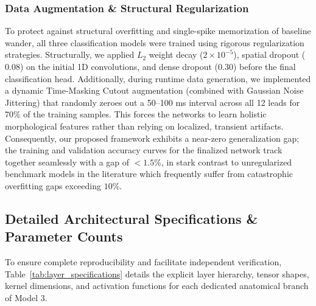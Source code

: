 \documentclass[5p,twocolumn,10pt]{elsarticle}
\begin{document}
\subsubsection{Data Augmentation \& Structural Regularization}
To protect against structural overfitting and single-spike memorization of baseline wander, all three classification models were trained using rigorous regularization strategies. Structurally, we applied $L_2$ weight decay ($2 \times 10^{-5}$), spatial dropout ($0.08$) on the initial 1D convolutions, and dense dropout ($0.30$) before the final classification head. Additionally, during runtime data generation, we implemented a dynamic Time-Masking Cutout augmentation (combined with Gaussian Noise Jittering) that randomly zeroes out a 50--100 ms interval across all 12 leads for 70\% of the training samples. This forces the networks to learn holistic morphological features rather than relying on localized, transient artifacts. Consequently, our proposed framework exhibits a near-zero generalization gap; the training and validation accuracy curves for the finalized network track together seamlessly with a gap of $<1.5\%$, in stark contrast to unregularized benchmark models in the literature which frequently suffer from catastrophic overfitting gaps exceeding $10\%$.

\subsection{Detailed Architectural Specifications \& Parameter Counts}
\label{sec:arch_specs}
To ensure complete reproducibility and facilitate independent verification, Table~\ref{tab:layer_specifications} details the explicit layer hierarchy, tensor shapes, kernel dimensions, and activation functions for each dedicated anatomical branch of Model 3.
\end{document}
